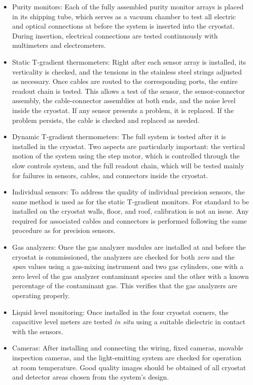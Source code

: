 \begin{itemize}
\item {Purity monitors}: Each of the fully assembled purity monitor arrays is placed in its shipping tube, which serves as a vacuum chamber to test all electric and optical connections at \surf before the system is inserted into the cryostat. During insertion, electrical connections are tested continuously with multimeters and electrometers.

\item {Static T-gradient thermometers}: Right after each sensor array is installed, its verticality 
is checked, and the tensions in the stainless steel strings adjusted as necessary. Once cables are routed to the corresponding  ports, the entire readout chain is tested. This allows a test of the sensor, the sensor-connector assembly, the cable-connector assemblies at both ends, and the noise level inside the cryostat.
If any sensor presents a problem, it is replaced. If the problem persists, the cable is checked and replaced as needed.

\item {Dynamic T-gradient thermometers}: The full system is tested after it is installed in the cryostat. Two aspects are particularly important: the vertical motion of the system using the step motor, which is controlled through the slow controls system, and the full readout chain, which will be tested mainly for failures in sensors, cables, and connectors inside the cryostat. 

\item {Individual sensors}: To address the quality of individual precision sensors, the same method is used as for
the static T-gradient monitors. For standard  to be installed on the cryostat walls, floor, and roof, calibration is not an issue. Any  required for associated cables and connectors is performed following the same procedure as for precision sensors.

\item {Gas analyzers}: Once the gas analyzer modules are installed at \surf and before the cryostat is commissioned, the analyzers 
are checked for both \textit{zero} and the \textit{span} values using a gas-mixing instrument and two gas cylinders, one with a
zero level of the gas analyzer contaminant species and the other with a known percentage of the contaminant gas. This verifies that the gas analyzers are operating properly. 

\item {Liquid level monitoring}: Once installed in the four cryostat corners, the capacitive level meters are tested \textit{in situ}  
using a suitable dielectric in contact with the sensors.

\item {Cameras}: After installing and connecting the wiring, fixed cameras, movable inspection cameras, and the light-emitting system are checked for operation at room temperature. Good quality images should be obtained of all cryostat and detector areas chosen from the system's design.  
\end{itemize}

